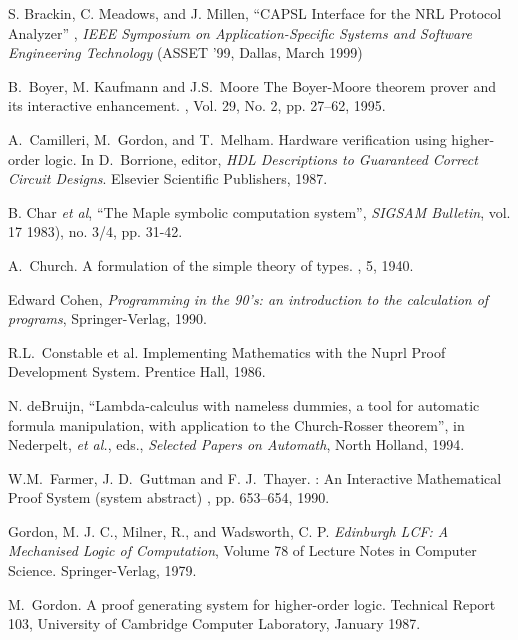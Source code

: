 \documentclass{kluwer}
\begin{document}
\begin{article}
\begin{thebibliography}{99}
 S. Brackin, C. Meadows, and J. Millen, ``CAPSL
Interface for the NRL Protocol Analyzer'' , {\em IEEE Symposium on
Application-Specific Systems and Software Engineering Technology\/}
(ASSET '99, Dallas, March 1999)

 B.~Boyer, M. Kaufmann and J.S.~Moore \newblock
The Boyer-Moore theorem prover and its interactive enhancement.
, Vol. 29,
No. 2, pp. 27--62, 1995.

A.~Camilleri, M.~Gordon, and T.~Melham.
\newblock Hardware verification using higher-order logic.
\newblock In D.~Borrione, editor, {\em HDL Descriptions to Guaranteed 
Correct
  Circuit Designs}. Elsevier Scientific Publishers, 1987.

 B. Char {\em et al\/}, ``The Maple symbolic
computation system'', {\em SIGSAM Bulletin\/}, vol. 17 1983), no. 3/4,
pp. 31-42.


A.~Church.
\newblock A formulation of the simple theory of types.
, 5, 1940.


 Edward Cohen, {\em Programming in the 90's: an introduction to
the calculation of programs\/}, Springer-Verlag, 1990.

R.L.~Constable et al.
\newblock Implementing Mathematics with the Nuprl Proof Development
System.
\newblock Prentice Hall, 1986.


 N. deBruijn, ``Lambda-calculus with nameless dummies, a
tool for automatic formula manipulation, with application to the
Church-Rosser theorem'', in Nederpelt, {\em et al.\/}, eds., {\em
Selected Papers on Automath\/}, North Holland, 1994.

W.M.~Farmer, J. D.~Guttman and F. J.~Thayer.
: An Interactive Mathematical Proof System (system 
abstract)
,  
pp. 653--654, 1990.

 Gordon, M. J. C., Milner, R., and Wadsworth, C. P. {\em
Edinburgh LCF: A Mechanised Logic of Computation\/}, Volume 78 of
Lecture Notes in Computer Science.  Springer-Verlag, 1979.


M.~Gordon.
\newblock A proof generating system for higher-order logic.
\newblock Technical Report 103, University of Cambridge Computer 
Laboratory,
  January 1987.


\end{thebibliography}
\end{article}
\end{document}
